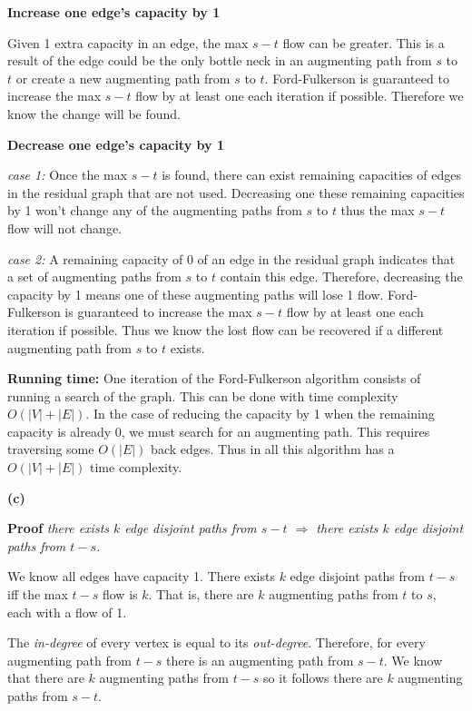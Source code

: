 \documentclass[11pt]{article}
\renewcommand\part[1]{\vspace{.10in}\textbf{(#1)}}
\newcommand\runtime{\vspace{.10in}\textbf{Running time: }}
\begin{document}
\textbf{Increase one edge's capacity by 1}

Given 1 extra capacity in an edge, the max $s-t$ flow can be greater. This is a result of the edge could be the only bottle neck in an augmenting path from $s$ to $t$ or create a new augmenting path from $s$ to $t$. Ford-Fulkerson is guaranteed to increase the max $s-t$ flow by at least one each iteration if possible. Therefore we know the change will be found.

\textbf{Decrease one edge's capacity by 1}

\textit{case 1:} Once the max $s-t$ is found, there can exist remaining capacities of edges in the residual graph that are not used. Decreasing one these remaining capacities by 1 won't change any of the augmenting paths from $s$ to $t$ thus the max $s-t$ flow will not change.

\textit{case 2:} A remaining capacity of 0 of an edge in the residual graph indicates that a set of augmenting paths from $s$ to $t$ contain this edge. Therefore, decreasing the capacity by 1 means one of these augmenting paths will lose 1 flow. Ford-Fulkerson is guaranteed to increase the max $s-t$ flow by at least one each iteration if possible. Thus we know the lost flow can be recovered if a different augmenting path from $s$ to $t$ exists.

\runtime One iteration of the Ford-Fulkerson algorithm consists of running a search of the graph. This can be done with time complexity $O(|V| + |E|)$. In the case of reducing the capacity by 1 when the remaining capacity is already 0, we must search for an augmenting path. This requires traversing some $O(|E|)$ back edges. Thus in all this algorithm has a $O(|V| + |E|)$ time complexity.


\part{c} 

\textbf{Proof} \textit{there exists $k$ edge disjoint paths from $s-t$ $\Rightarrow$ there exists $k$ edge disjoint paths from $t-s$.}

We know all edges have capacity 1. There exists $k$ edge disjoint paths from $t-s$ iff the max $t-s$ flow is $k$. That is, there are $k$ augmenting paths from $t$ to $s$, each with a flow of 1.

The \textit{in-degree} of every vertex is equal to its \textit{out-degree}. Therefore, for every augmenting path from $t-s$ there is an augmenting path from $s-t$. We know that there are $k$ augmenting paths from $t - s$ so it follows there are $k$ augmenting paths from $s - t$.
\end{document}

